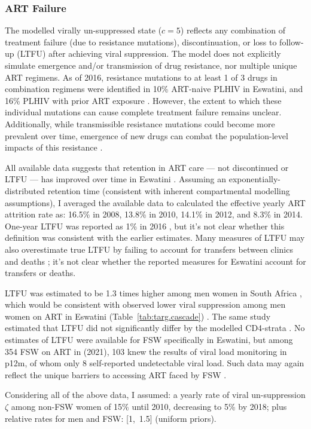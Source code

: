 \subsubsection{ART Failure}\label{model.par.cascade.fail}
The modelled virally un-suppressed state ($c=5$) reflects any combination of
treatment failure (\ie due to resistance mutations),
discontinuation, or loss to follow-up (LTFU) after achieving viral suppression.
The model does not explicitly simulate emergence and/or transmission of drug resistance,
nor multiple unique ART regimens.
As of 2016, resistance mutations to at least 1 of 3 drugs in combination regimens
were identified in 10\% ART-naive PLHIV in Eswatini,
and 16\% PLHIV with prior ART exposure \cite{WHO2021dr}.
However, the extent to which these individual mutations can cause
complete treatment failure remains unclear. %
Additionally, while transmissible resistance mutations could become more prevalent over time,
emergence of new drugs can combat the population-level impacts of this resistance \cite{Hauser2019}.
\par
All available data suggests that retention in ART care
--- \ie not discontinued or LTFU ---
has improved over time in Eswatini \cite{NERCHA2014a,NERCHA2018a,SHIMS2}.
Assuming an exponentially-distributed retention time
(consistent with inherent compartmental modelling assumptions),
I averaged the available data \cite[Table~6]{NERCHA2018a}
to calculated the effective yearly ART attrition rate as:
16.5\% in 2008, 13.8\% in 2010, 14.1\% in 2012, and 8.3\% in 2014.
One-year LTFU was reported as 1\% in 2016 \cite{SHIMS2},
but it's not clear whether this definition was consistent with the earlier estimates.
Many measures of LTFU may also overestimate true LTFU
by failing to account for transfers between clinics and deaths \cite{Fox2018,Wilkinson2015};
it's not clear whether the reported measures for Eswatini account for transfers or deaths.
\par
LTFU was estimated to be 1.3 times higher among men \vs women in South Africa \cite{Fox2018},
which would be consistent with observed lower viral suppression among men \vs women on ART
in Eswatini (Table~\ref{tab:targ.cascade}) \cite{Fox2018}.
The same study estimated that LTFU did not significantly differ
by the modelled CD4-strata \cite{Fox2018}.
No estimates of LTFU were available for FSW specifically in Eswatini,
but among 354 FSW on ART in \cite{EswIBBS2022} (2021),
103 knew the results of viral load monitoring in p12m,
of whom only 8 self-reported undetectable viral load.
Such data may again reflect the unique barriers to accessing ART faced by FSW \cite{Lancaster2016}.
\par
Considering all of the above data, I assumed:
a yearly rate of viral un-suppression $\zeta$ among non-FSW women of
15\% until 2010, decreasing to 5\% by 2018;
plus relative rates for men and FSW: [1,~1.5] (uniform priors).
